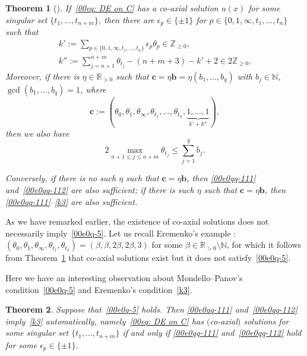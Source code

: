 \documentclass[11pt]{article}
\numberwithin{equation}{section}
\numberwithin{equation}{section}
\newtheorem{Theorem}{Theorem}[section]
\def\N{\mathbb N}
\begin{document}
\begin{Theorem}[\cite{Coaxial}]\label{thm-Eremenko}
If~\eqref{00eq: DE on C} has a co-axial solution $u(x)$ for some singular set $\{t_1,\dots,t_{n+m}\}$, then
 there are $\epsilon_{p}\in\{\pm 1\}$ for $p\in
 \{0,1,\infty,t_1,\dots,t_n\}$ such that
\begin{gather}
k':=\sum_{p\in\{0,1,\infty,t_1,\dots,t_n\}} \epsilon_{p}\theta_{p}\in\mathbb{Z}_{\geq 0},\label{00e0qq-111}
\\
k'':=\sum_{j=n+1}^{n+m} \theta_{t_j}-(n+m+3)-k'+2\in 2\mathbb{Z}_{\geq 0}.\label{00e0qq-112}
\end{gather}
Moreover, if there is $\eta\in\mathbb{R}_{>0}$ such that
$\mathbf{c}=\eta\mathbf{b}=\eta(b_1,\dots,b_q)$ with
$b_j\in\mathbb{N}$, $\gcd(b_1,\dots,b_q)=1$, where
\[
 \boldsymbol c:=(\theta_0,\theta_1,\theta_\infty,\theta_{t_1},
 \dots,\theta_{t_n},\underbrace{1,\dots,1}_{k'+k''}),
\]
then we also have
\begin{equation}\label{k3}
 2\max_{n+1\leq j\leq {n+m}}\theta_{t_j}\leq \sum_{j=1}^q b_j.
\end{equation}



Conversely, if there is no such $\eta$ such that
$\mathbf{c}=\eta\mathbf{b}$, then
\eqref{00e0qq-111} and~\eqref{00e0qq-112} are also sufficient; if there
is such $\eta$ such that $\mathbf{c}=\eta\mathbf{b}$, then
\eqref{00e0qq-111}--\eqref{k3} are also sufficient.
\end{Theorem}

As we have remarked earlier, the existence of co-axial solutions does
not necessarily imply~\eqref{00e0q-5}. Let us recall Eremenko's
example \cite{Coaxial}:
$(\theta_0,\theta_1,\theta_\infty,\theta_{t_1},\theta_{t_2})=(\beta,\beta,2\beta,2\beta,3)$
for some $\beta\in\mathbb{R}_{>0}\setminus\N$, for which it follows
from Theorem~\ref{thm-Eremenko} that co-axial solutions exist but it
does not satisfy~\eqref{00e0q-5}.

Here we have an interesting observation about Mondello--Panov's
condition~\eqref{00e0q-5} and Eremenko's condition~\eqref{k3}.

\begin{Theorem}\label{thm-MP-E}
Suppose that~\eqref{00e0q-5} holds. Then
\eqref{00e0qq-111} and~\eqref{00e0qq-112} imply~\eqref{k3} automatically,
namely~\eqref{00eq: DE on C} has $($co-axial$)$ solutions for some
singular set $\{t_1,\dots,t_{n+m}\}$ if and only if
\eqref{00e0qq-111} and~\eqref{00e0qq-112} hold for some
$\epsilon_p\in\{\pm 1\}$.
\end{Theorem}
\end{document}
